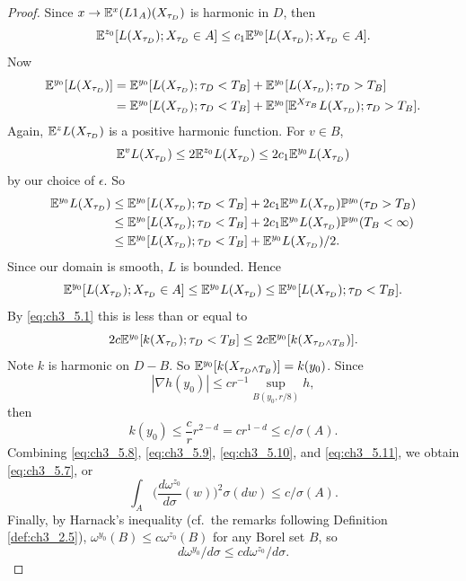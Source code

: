 \begin{proof}
Since $x \to \mathbb{E}^x(L1_A)(X_{\tau_D})$ is harmonic in $D$, then
\begin{equation}\label{eq:ch3_5.8}
    \mathbb{E}^{z_0}[L(X_{\tau_D}); X_{\tau_D} \in A] \leq c_1\mathbb{E}^{y_0}[L(X_{\tau_D}); X_{\tau_D} \in A].
\end{equation}
Now
\begin{align*}
    \mathbb{E}^{y_0}[L(X_{\tau_D})] &= \mathbb{E}^{y_0}[L(X_{\tau_D}); \tau_D < T_B] + \mathbb{E}^{y_0}[L(X_{\tau_D}); \tau_D > T_B] \\
    &= \mathbb{E}^{y_0}[L(X_{\tau_D}); \tau_D < T_B] + \mathbb{E}^{y_0}[\mathbb{E}^{X_{T_B}}L(X_{\tau_D}); \tau_D > T_B].
\end{align*}
Again, $\mathbb{E}^zL(X_{\tau_D})$ is a positive harmonic function. For $v \in B$,
\[
    \mathbb{E}^vL(X_{\tau_D}) \leq 2\mathbb{E}^{z_0}L(X_{\tau_D}) \leq 2c_1\mathbb{E}^{y_0}L(X_{\tau_D})
\]
by our choice of $\epsilon$. So
\begin{align*}
    \mathbb{E}^{y_0}L(X_{\tau_D}) &\leq \mathbb{E}^{y_0}[L(X_{\tau_D}); \tau_D < T_B] + 2c_1\mathbb{E}^{y_0}L(X_{\tau_D})\mathbb{P}^{y_0}(\tau_D > T_B) \\
    &\leq \mathbb{E}^{y_0}[L(X_{\tau_D}); \tau_D < T_B] + 2c_1\mathbb{E}^{y_0}L(X_{\tau_D})\mathbb{P}^{y_0}(T_B<\infty) \\
    &\leq \mathbb{E}^{y_0}[L(X_{\tau_D}); \tau_D < T_B] + \mathbb{E}^{y_0}L(X_{\tau_D})/2.
\end{align*}
Since our domain is smooth, $L$ is bounded. Hence
\begin{equation}\label{eq:ch3_5.9}
    \mathbb{E}^{y_0}[L(X_{\tau_D}); X_{\tau_D} \in A] \leq \mathbb{E}^{y_0}L(X_{\tau_D}) \leq \mathbb{E}^{y_0}[L(X_{\tau_D}); \tau_D < T_B].
\end{equation}
By \eqref{eq:ch3_5.1} this is less than or equal to
\begin{equation}\label{eq:ch3_5.10}
    2c\mathbb{E}^{y_0}[k(X_{\tau_D}); \tau_D < T_B] \leq 2c\mathbb{E}^{y_0}[k(X_{\tau_D \wedge T_B})].
\end{equation}
Note $k$ is harmonic on $D - B$. So $\mathbb{E}^{y_0}[k(X_{\tau_D \wedge T_B})] = k(y_0)$. Since
\[
    |\nabla h(y_0)| \leq cr^{-1} \sup_{B(y_0,r/8)} h,
\]
then
\begin{equation}\label{eq:ch3_5.11}
    k(y_0) \leq \frac{c}{r}r^{2-d} = cr^{1-d} \leq c/\sigma(A).
\end{equation}
Combining \eqref{eq:ch3_5.8}, \eqref{eq:ch3_5.9}, \eqref{eq:ch3_5.10}, and \eqref{eq:ch3_5.11}, we obtain \eqref{eq:ch3_5.7}, or
\begin{equation}\label{eq:ch3_5.12}
    \int_A \Big(\frac{d\omega^{z_0}}{d\sigma}(w)\Big)^2\sigma(dw) \leq c/\sigma(A).
\end{equation}
Finally, by Harnack's inequality (cf.\ the remarks following Definition \ref{def:ch3_2.5}), $\omega^{y_0}(B) \leq c\omega^{z_0}(B)$ for any Borel set $B$, so
\[
    d\omega^{y_0}/d\sigma \leq cd\omega^{z_0}/d\sigma.
\]
\end{proof}

